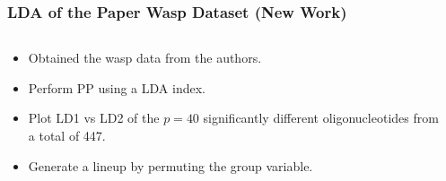 \documentclass{beamer}
\begin{document}
\begin{frame}
	\frametitle{LDA of the Paper Wasp Dataset (New Work)}
	\begin{columns}
		\begin{column}{0.4\textwidth}
		  \begin{itemize}
		  	\item Obtained the wasp data from the authors. 
			  \item Perform PP using a LDA index.
			\item Plot LD1 vs LD2 of the $p=40$ significantly different oligonucleotides from a total of 447.
			 \item Generate a lineup by permuting the group variable. 
 
		  \end{itemize}		
			
		\end{column}
		
		\begin{column}{0.6\textwidth}
			 \begin{center}  \end{center}
		\end{column}
	\end{columns}  

\end{frame}
\end{document}
